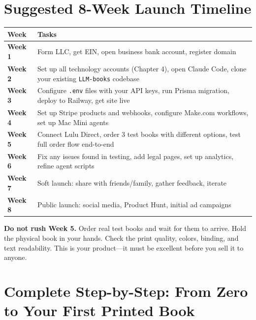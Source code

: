 \documentclass[12pt, letterpaper, oneside]{book}
\begin{document}
\chapter{Suggested 8-Week Launch Timeline}

\begin{table}[H]
\centering
\begin{tabularx}{\textwidth}{lX}
\toprule
\textbf{Week} & \textbf{Tasks} \\
\midrule
\textbf{Week 1} & Form LLC, get EIN, open business bank account, register domain \\
\textbf{Week 2} & Set up all technology accounts (Chapter 4), open Claude Code, clone your existing \texttt{LLM-books} codebase \\
\textbf{Week 3} & Configure \texttt{.env} files with your API keys, run Prisma migration, deploy to Railway, get site live \\
\textbf{Week 4} & Set up Stripe products and webhooks, configure Make.com workflows, set up Mac Mini agents \\
\textbf{Week 5} & Connect Lulu Direct, order 3 test books with different options, test full order flow end-to-end \\
\textbf{Week 6} & Fix any issues found in testing, add legal pages, set up analytics, refine agent scripts \\
\textbf{Week 7} & Soft launch: share with friends/family, gather feedback, iterate \\
\textbf{Week 8} & Public launch: social media, Product Hunt, initial ad campaigns \\
\bottomrule
\end{tabularx}
\end{table}

\begin{infobox}
\textbf{Do not rush Week 5.} Order real test books and wait for them to arrive. Hold the physical book in your hands. Check the print quality, colors, binding, and text readability. This is your product---it must be excellent before you sell it to anyone.
\end{infobox}

\chapter{Complete Step-by-Step: From Zero to Your First Printed Book}
\end{document}
